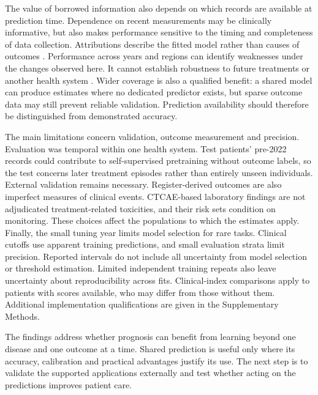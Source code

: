 The value of borrowed information also depends on which records are
available at prediction time. 
Dependence on recent measurements may be clinically informative, but also
makes performance sensitive to the timing and completeness of data collection.
Attributions describe the fitted model rather than causes of outcomes
\citep{ghassemi2021explainability}. Performance across years and regions can
identify weaknesses under the changes observed here. It cannot establish
robustness to future treatments or another health system
\citep{finlayson2021shift}. Wider coverage is also a qualified benefit: a shared
model can produce estimates where no dedicated predictor exists, but sparse
outcome data may still prevent reliable validation. Prediction availability
should therefore be distinguished from demonstrated accuracy.

The main limitations concern validation, outcome measurement and precision.
Evaluation was temporal within one health system. Test patients' pre-2022
records could contribute to self-supervised pretraining without outcome labels,
so the test concerns later treatment episodes rather than entirely unseen
individuals. External validation remains necessary. Register-derived outcomes
are also imperfect measures of clinical events. CTCAE-based laboratory
findings are not adjudicated treatment-related toxicities, and their risk sets
condition on monitoring. These choices affect the populations to which the
estimates apply. Finally, the small tuning year limits model selection for rare tasks.
Clinical cutoffs use apparent training predictions, and small evaluation strata
limit precision. Reported intervals do not include all uncertainty from model
selection or threshold estimation. Limited independent training repeats also leave uncertainty
about reproducibility across fits. Clinical-index comparisons apply to patients
with scores available, who may differ from those without them. Additional
implementation qualifications are given in the Supplementary Methods.

The findings address whether prognosis can benefit from learning beyond one
disease and one outcome at a time.  Shared prediction is useful only where its
accuracy, calibration and practical advantages justify its use. The next step
is to validate the supported applications externally and test whether acting
on the predictions improves patient care.

